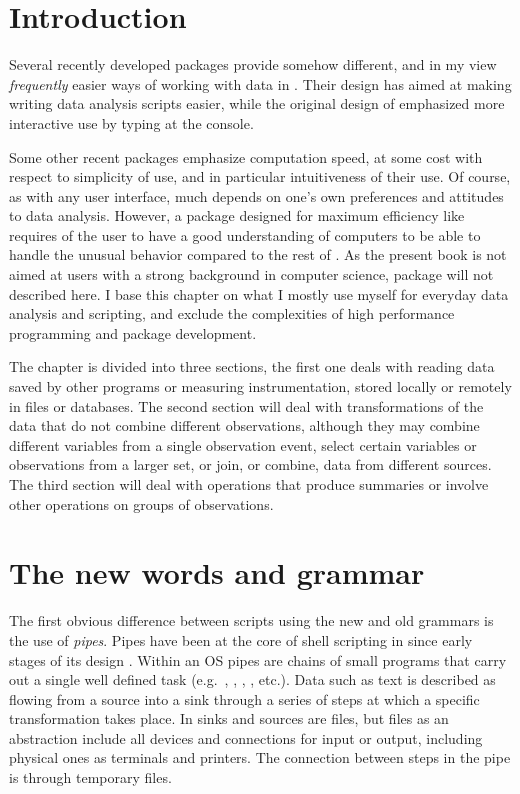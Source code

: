 \documentclass[krantz2]{krantz}\usepackage{knitr}%
\begin{document}
\section{Introduction}

 Several recently developed packages provide somehow different, and in my view \emph{frequently} easier ways of working with data in \Rlang. Their design has aimed at making writing data analysis scripts easier, while the original design of \Rlang emphasized more interactive use by typing at the \Rlang console.

Some other recent packages emphasize computation speed, at some cost with respect to simplicity of use, and in particular intuitiveness of their use. Of course, as with any user interface, much depends on one's own preferences and attitudes to data analysis. However, a package designed for maximum efficiency like  requires of the user to have a good understanding of computers to be able to handle the unusual behavior compared to the rest of \Rlang. As the present book is not aimed at users with a strong background in computer science, package  will not described here. I base this chapter on what I mostly use myself for everyday data analysis and scripting, and exclude the complexities of high performance \Rlang programming and package development.

The chapter is divided into three sections, the first one deals with reading data saved by other programs or measuring instrumentation, stored locally or remotely in files or  databases. The second section will deal with transformations of the data that do not combine different observations, although they may combine different variables from a single observation event, select certain variables or observations from a larger set, or join, or combine, data from different sources. The third section will deal with operations that produce summaries or involve other operations on groups of observations.

\section{The new words and grammar}

The first obvious difference between scripts using the new and old grammars is the use of \emph{pipes}. Pipes have been at the core of shell scripting in  since early stages of its design \cite{Kernigham1981}. Within an OS pipes are chains of small programs that carry out a single well defined task (e.g.\ , , , , etc.). Data such as text is described as flowing from a source into a sink through a series of steps at which a specific transformation takes place. In  sinks and sources are files, but files as an abstraction include all devices and connections for input or output, including physical ones as terminals and printers. The connection between steps in the pipe is through temporary files.
\end{document}
